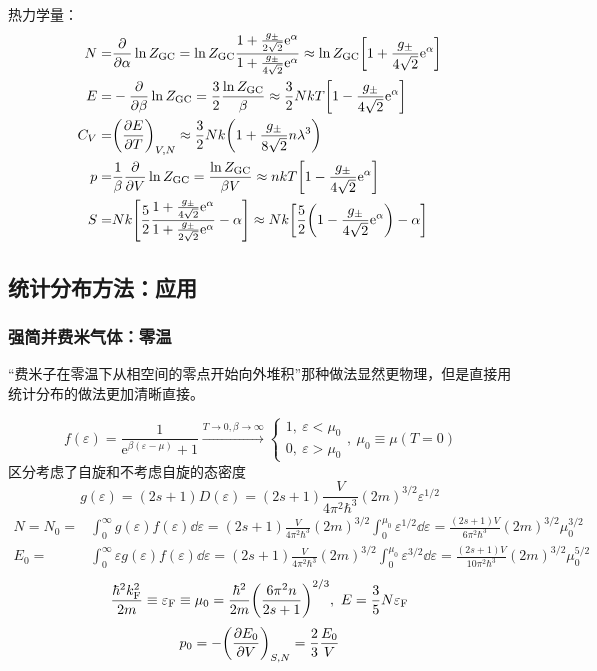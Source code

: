 热力学量：\begin{align*}
    N = & \pdv{\alpha} \ln{Z_{\text{GC}}} = \ln{Z_{\text{GC}}} \frac{1 + \frac{g_{\pm}}{2 \sqrt{2}} \mathrm{e}^{\alpha}}{1 + \frac{g_{\pm}}{4 \sqrt{2}} \mathrm{e}^{\alpha}} \approx \ln{Z_{\text{GC}}} \qty[1 + \frac{g_{\pm}}{4 \sqrt{2}} \mathrm{e}^{\alpha}] \\
    E = & - \pdv{\beta} \ln{Z_{\text{GC}}} = \frac{3}{2} \frac{\ln{Z_{\text{GC}}}}{\beta} \approx \frac{3}{2} N k T \qty[1 - \frac{g_{\pm}}{4 \sqrt{2}} \mathrm{e}^{\alpha}]\\
    C_V = & \qty(\pdv{E}{T})_{V, N} \approx \frac{3}{2} N k \qty(1 + \frac{g_{\pm}}{8 \sqrt{2}} n \lambda^3)\\
    p = & \frac{1}{\beta} \pdv{V} \ln{Z_{\text{GC}}} = \frac{\ln{Z_{\text{GC}}}}{\beta V} \approx n k T \qty[1 - \frac{g_{\pm}}{4 \sqrt{2}} \mathrm{e}^{\alpha}]\\
    S = & N k \qty[\frac{5}{2} \frac{1 + \frac{g_{\pm}}{4 \sqrt{2}} \mathrm{e}^{\alpha}}{1 + \frac{g_{\pm}}{2 \sqrt{2}} \mathrm{e}^{\alpha}} - \alpha] \approx N k \qty[\frac{5}{2} \qty(1 - \frac{g_{\pm}}{4 \sqrt{2}} \mathrm{e}^{\alpha}) - \alpha]
\end{align*}

\subsection{统计分布方法：应用}

\subsubsection{强简并费米气体：零温}

“费米子在零温下从相空间的零点开始向外堆积”那种做法显然更物理，但是直接用统计分布的做法更加清晰直接。

\[
f(\varepsilon) = \frac{1}{\mathrm{e}^{\beta (\varepsilon - \mu)} + 1} \xrightarrow{T \to 0, \beta \to \infty} \begin{cases}
1,\ \varepsilon < \mu_0\\
0,\ \varepsilon > \mu_0
\end{cases},\ \mu_0 \equiv \mu(T = 0)
\] 区分考虑了自旋和不考虑自旋的态密度 \[
g(\varepsilon) = (2 s + 1) D(\varepsilon) = (2 s + 1) \frac{V}{4 \pi^2 \hbar^3} (2 m)^{3/2} \varepsilon^{1/2}
\] \begin{align*}
    N = N_0 = & \int_{0}^{\infty} g(\varepsilon) f(\varepsilon) \dd{\varepsilon} = (2 s + 1) \frac{V}{4 \pi^2 \hbar^3} (2 m)^{3/2} \int_{0}^{\mu_0} \varepsilon^{1/2} \dd{\varepsilon} = \frac{(2 s + 1) V}{6 \pi^2 \hbar^3} (2 m)^{3 / 2} \mu_{0}^{3/2}\\
    E_0 = & \int_{0}^{\infty} \varepsilon g(\varepsilon) f(\varepsilon) \dd{\varepsilon} = (2 s + 1) \frac{V}{4 \pi^2 \hbar^3} (2 m)^{3/2} \int_{0}^{\mu_0} \varepsilon^{3/2} \dd{\varepsilon} = \frac{(2 s + 1) V}{10 \pi^2 \hbar^3} (2 m)^{3/2} \mu_0^{5/2}
\end{align*} \[
\frac{\hbar^2 k_{\text{F}}^2}{2 m} \equiv \varepsilon_{\text{F}} \equiv \mu_0 = \frac{\hbar^2}{2 m} \qty(\frac{6 \pi^2 n}{2 s + 1})^{2/3},\ E = \frac{3}{5} N \varepsilon_{\text{F}}
\] \[
p_0 = - \qty(\pdv{E_0}{V})_{S, N} = \frac{2}{3} \frac{E_0}{V}
\]

